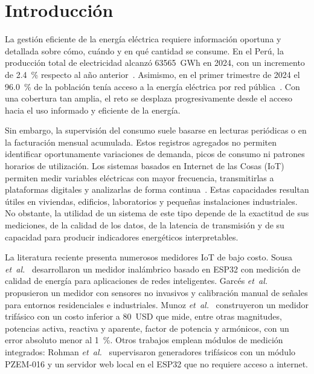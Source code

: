 \section{Introducción}
\label{sec:introduction}

La gestión eficiente de la energía eléctrica requiere información oportuna y detallada sobre cómo, cuándo y en qué cantidad se consume.
En el Perú, la producción total de electricidad alcanzó \SI{63565}{GWh} en 2024, con un incremento de \SI{2,4}{\percent} respecto al año anterior~\cite{minem2025produccion}.
Asimismo, en el primer trimestre de 2024 el \SI{96,0}{\percent} de la población tenía acceso a la energía eléctrica por red pública~\cite{inei2024acceso}.
Con una cobertura tan amplia, el reto se desplaza progresivamente desde el acceso hacia el uso informado y eficiente de la energía.

Sin embargo, la supervisión del consumo suele basarse en lecturas periódicas o en la facturación mensual acumulada.
Estos registros agregados no permiten identificar oportunamente variaciones de demanda, picos de consumo ni patrones horarios de utilización.
Los sistemas basados en Internet de las Cosas (IoT) permiten medir variables eléctricas con mayor frecuencia, transmitirlas a plataformas digitales y analizarlas de forma continua~\cite{rind2023perspective}.
Estas capacidades resultan útiles en viviendas, edificios, laboratorios y pequeñas instalaciones industriales.
No obstante, la utilidad de un sistema de este tipo depende de la exactitud de sus mediciones, de la calidad de los datos, de la latencia de transmisión y de su capacidad para producir indicadores energéticos interpretables.

La literatura reciente presenta numerosos medidores IoT de bajo costo.
Sousa \textit{et~al.}~\cite{sousa2023smartmeter} desarrollaron un medidor inalámbrico basado en ESP32 con medición de calidad de energía para aplicaciones de redes inteligentes.
Garcés \textit{et~al.}~\cite{garces2025iotmeter} propusieron un medidor con sensores no invasivos y calibración manual de señales para entornos residenciales e industriales.
Munoz \textit{et~al.}~\cite{munoz2024smartmeter} construyeron un medidor trifásico con un costo inferior a \SI{80}{USD} que mide, entre otras magnitudes, potencias activa, reactiva y aparente, factor de potencia y armónicos, con un error absoluto menor al \SI{1}{\percent}.
Otros trabajos emplean módulos de medición integrados: Rohman \textit{et~al.}~\cite{rohman2025esp32} supervisaron generadores trifásicos con un módulo PZEM-016 y un servidor web local en el ESP32 que no requiere acceso a internet.

